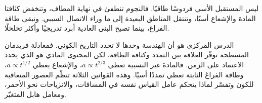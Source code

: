 ليس المستقبل الأسي فردوسًا طاقيًا. فالنجوم تنطفئ في نهاية المطاف، وتنخفض كثافتا المادة والإشعاع أسيًا، وتنتقل المناطق البعيدة إلى ما وراء الاتصال السببي. وتبقى طاقة الفراغ، بينما تصبح البنى العادية أبرد تدريجيًا وأكثر تخلخلًا.

\begin{classroomqa}
\end{classroomqa}

الدرس المركزي هو أن الهندسة وحدها لا تحدد التاريخ الكوني. فمعادلة فريدمان المسطحة توفّر العلاقة بين التمدد وكثافة الطاقة، لكن المحتوى المادي هو الذي يحدد الاعتماد على الزمن. فالمادة غير النسبية تعطي \(a\propto t^{2/3}\)، والإشعاع يعطي \(a\propto t^{1/2}\)، وطاقة الفراغ الثابتة تعطي تمددًا أسيًا. وهذه القوانين الثلاثة تنظّم العصور المتعاقبة للكون وتفسّر لماذا يتحكم عامل القياس نفسه في المسافات، والانزياحات نحو الأحمر، ومعامل هابل المتغيّر.
